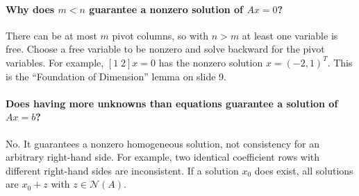 \documentclass[10pt,english]{article}
\begin{document}
\paragraph{Why does $m<n$ guarantee a nonzero solution of $Ax=0$?}
There can be at most $m$ pivot columns, so with $n>m$ at least one variable is free.
Choose a free variable to be nonzero and solve backward for the pivot variables.
For example, $[1\;2]x=0$ has the nonzero solution $x=(-2,1)^T$.
This is the ``Foundation of Dimension'' lemma on slide 9.

\paragraph{Does having more unknowns than equations guarantee a solution of $Ax=b$?}
No. It guarantees a nonzero homogeneous solution, not consistency for an arbitrary right-hand side.
For example, two identical coefficient rows with different right-hand sides are inconsistent.
If a solution $x_0$ does exist, all solutions are $x_0+z$ with $z\in\mathcal{N}(A)$.
\end{document}
